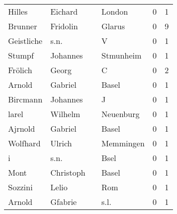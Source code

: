 \begin{tabular}{llllrr}
                   Hilles &                            Eichard &             &                                      London &          0 &         1 \\
                  Brunner &                           Fridolin &             &                                      Glarus &          0 &         9 \\
               Geistliche &                               s.n. &             &                                           V &          0 &         1 \\
                   Stumpf &                           Johannes &             &                                   Stmunheim &          0 &         1 \\
                  Frölich &                              Georg &             &                                           C &          0 &         2 \\
                   Arnold &                            Gabriel &             &                                       Basel &          0 &         1 \\
                 Bircmann &                           Johannes &             &                                           J &          0 &         1 \\
                    larel &                            Wilhelm &             &                                   Neuenburg &          0 &         1 \\
                  Ajrnold &                            Gabriel &             &                                       Basel &          0 &         1 \\
                 Wolfhard &                             Ulrich &             &                                   Memmingen &          0 &         1 \\
                        i &                               s.n. &             &                                        Bsel &          0 &         1 \\
                     Mont &                          Christoph &             &                                       Basel &          0 &         1 \\
                  Sozzini &                              Lelio &             &                                         Rom &          0 &         1 \\
                   Arnold &                            Gfabrie &             &                                        s.l. &          0 &         1 \\

\end{tabular}
